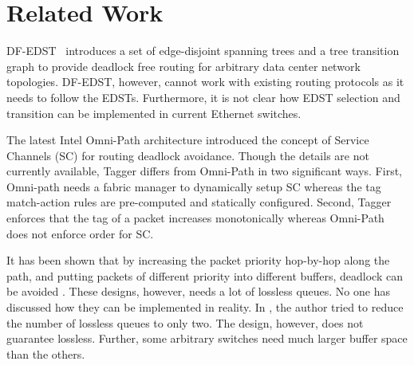 \section{Related Work}\label{sec:related}




DF-EDST~\cite{dfedst16} introduces a set of edge-disjoint spanning trees and a tree transition graph to provide deadlock free routing for arbitrary data center network topologies. DF-EDST, however, cannot work with existing routing protocols as it needs to follow the EDSTs. Furthermore, it is not clear how EDST selection and transition can be implemented in current Ethernet switches.  

The latest Intel Omni-Path architecture \cite{omnipath} introduced the concept of Service Channels (SC) for routing deadlock avoidance. Though the details are not currently available, Tagger differs from Omni-Path in two significant ways. First, Omni-path needs a fabric manager to dynamically setup SC whereas the tag match-action rules are pre-computed and statically configured. Second, Tagger enforces that the tag of a packet increases monotonically whereas Omni-Path does not enforce order for SC.

 It has been shown that by increasing the packet priority hop-by-hop along the path, and putting packets of different priority into different buffers, deadlock can be avoided \cite{firstpaper,survey,datanetworks,karol2003prevention}. These designs, however, needs a lot of lossless queues. No one
has discussed how they can be implemented in reality. In \cite{dag}, the author tried to reduce the number of lossless queues to only two. The design, however, does not guarantee lossless. Further, some arbitrary switches need much larger buffer space than the others.

